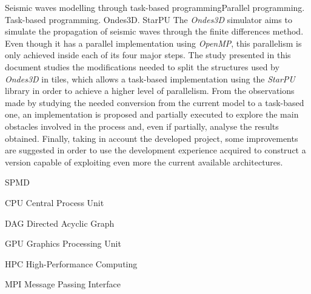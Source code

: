\documentclass[cic,tc]{iiufrgs}
\begin{document}
\begin{englishabstract}{Seismic waves modelling through task-based programming}{Parallel programming. Task-based programming. Ondes3D. StarPU}
  The \textit{Ondes3D} simulator aims to simulate the propagation of seismic waves through the finite differences method. Even though it has a parallel implementation using
  \textit{OpenMP}, this parallelism is only achieved inside each of its four major steps.
  The study presented in this document studies the modifications needed to split the structures used by \textit{Ondes3D} in tiles, which
  allows a task-based implementation using the \textit{StarPU} library in order to achieve a higher level of parallelism.
  From the observations made by studying the needed conversion from the current model to a task-based one, an implementation is proposed and partially executed to explore
  the main obstacles involved in the process and, even if partially, analyse the results obtained.
  Finally, taking in account the developed project, some improvements are suggested in order to use the development experience acquired to construct a version capable of
  exploiting even more the current available architectures.
\end{englishabstract}

\listoffigures

\listoftables

\begin{listofabbrv}{SPMD}
\item[CPU] Central Process Unit
\item[DAG] Directed Acyclic Graph
\item[GPU] Graphics Processing Unit
\item[HPC] High-Performance Computing
\item[MPI] Message Passing Interface
\end{listofabbrv}

\end{document}
